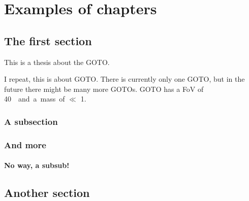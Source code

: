 \chapter{Examples of chapters}
\label{chap:examples}
\chaptoc{}
\newpage

\section{The first section}
\label{sec:section1}

This is a thesis about the \ac{GOTO}.

I repeat, this is about \ac{GOTO}. There is currently only one \ac{GOTO}, but in the future there might be many more \ac{GOTO}s. \ac{GOTO} has a \ac{FoV} of \about\SI{40}{\square\deg} and a mass of $\ll$ \SI{1}{\solarmass}.

\lipsum[1-2] %

\subsection{A subsection}

\lipsum[3-6] %

\subsection{And more}

\lipsum[7-9] %

\subsubsection{No way, a subsub!}

\lipsum[10-12] %


\section{Another section}
\label{sec:section2}

\lipsum[13-19] %
